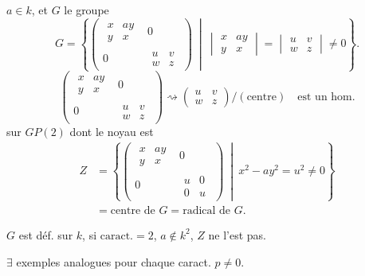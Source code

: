 
 $a\in k$, et $G$ le groupe
\[
G=\left\{\left(\begin{array}{cc}
\begin{matrix}x&ay\\y&x\end{matrix}&0\\
0&\begin{matrix}u&v\\w&z\end{matrix}
\end{array}\right)\ \middle|\ 
\begin{vmatrix}x&ay\\y&x\end{vmatrix}=\begin{vmatrix}u&v\\w&z\end{vmatrix}\ne0\right\}.
\]
\[
\left(\begin{array}{cc}
\begin{matrix}x&ay\\y&x\end{matrix}&0\\
0&\begin{matrix}u&v\\w&z\end{matrix}
\end{array}\right)\rightsquigarrow
\begin{pmatrix}u&v\\w&z\end{pmatrix}/(\text{centre})\quad\text{est un hom.}
\]
sur $GP(2)$ dont le noyau est
\[
\begin{aligned}
Z&=\left\{\left(\begin{array}{cc}
\begin{matrix}x&ay\\y&x\end{matrix}&0\\
0&\begin{matrix}u&0\\0&u\end{matrix}
\end{array}\right)\ \middle|\ x^2-ay^2=u^2\ne0\right\}\\
&=\text{centre de }G=\text{radical de }G.
\end{aligned}
\]

$G$ est déf. sur $k$,  si $\text{caract.}=2$, $a\notin k^2$, $Z$ ne l'est pas.

$\exists$ exemples analogues pour chaque caract. $p\ne0$.


